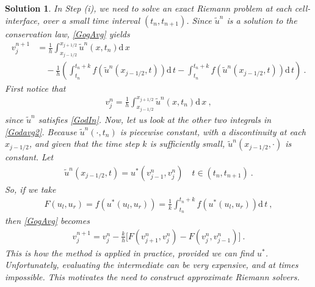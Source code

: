 \documentclass[10pt,letterpaper]{article}
\newcommand{\dif}[1][]{\mathrm{d} {#1}\,}
\newcommand{\rb}[1]{ \left(  {#1} \right) }
\newcommand{\frb}[1]{ \left(  {#1} \right) }
\theoremstyle{break}
\newtheorem{solution}{Solution}
\begin{document}
\begin{solution}
    In Step (i), we need to solve an exact Riemann problem at each cell-interface, over a small time interval $(t_n,t_{n+1})$. Since $\widetilde u^n$ is a solution to the conservation law, \eqref{GogAvg} yields
    \begin{align} \label{Godavg2}
        v_{j}^{n+1} &=\frac{1}{h}\int_{x_{j-1/2}}^{x_{j+1/2}}\tilde{u}^{n}\frb{x,t_{n}}\dif x\\
            &\quad -\frac{1}{h}\rb{
                \int_{t_n}^{t_n+k} f\frb{\tilde{u}^{n}\frb{x_{j-1/2},t}}\dif t
                -\int_{t_n}^{t_n+k} f\frb{\tilde{u}^{n}\frb{x_{j-1/2},t}}\dif t}\ .
    \end{align}
    First notice that
    \begin{gather}
        v^n_j=\frac{1}{h}\int_{x_{j-1/2}}^{x_{j+1/2}}\tilde{u}^{n}\frb{x,t_{n}}\dif x\ ,
    \end{gather}
    since $\widetilde u^n$ satisfies \eqref{GodIn}.
    Now, let us look at the other two integrals in \eqref{Godavg2}.
    Because $\widetilde u^n\frb{\cdot,t_n}$ is piecewise constant, with a discontinuity at each $x_{j-1/2}$, 
    and given that the time step $k$ is sufficiently small, $\widetilde u^n\frb{x_{j-1/2},\cdot}$ is constant. Let
    \begin{gather}
        \tilde{u}^{n}\frb{x_{j-1/2},t}=u^*\frb{v^n_{j-1},v^n_{j}}
        \quad
        t\in(t_n,t_{n+1})\ .
    \end{gather}
    So, if we take
    \begin{gather}
        F(u_l,u_r)=f\frb{u^*(u_l,u_r)}=\frac{1}{k}\int_{t_n}^{t_n+k} f\frb{u^*(u_l,u_r)}\dif t\ ,
    \end{gather}
    then \eqref{GogAvg} becomes
    \begin{gather} \label{GodCons}
        v^{n+1}_j=v^n_j-\frac{k}{h}\Big[ F\frb{v^n_{j+1},v^n_{j}} -F\frb{v^n_{j},v^n_{j-1}}\Big]\ .
    \end{gather}
    This is how the method is applied in practice, provided we can find $u^*$. Unfortunately, evaluating the intermediate can be very expensive, and at times impossible. This motivates the need to construct \textit{approximate Riemann solvers}.
\end{solution}
\end{document}
